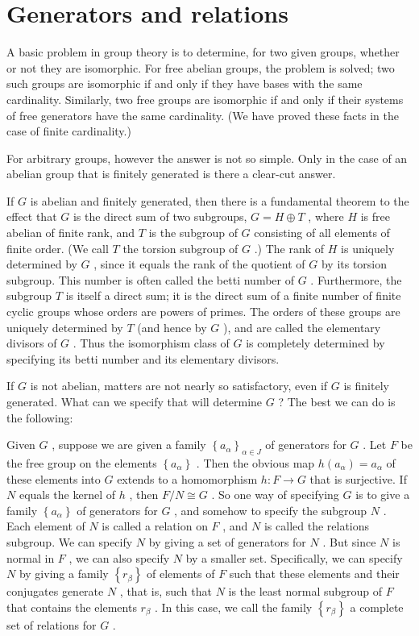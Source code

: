 \section*{Generators and relations}

A basic problem in group theory is to determine, for two given groups, whether or not they are isomorphic. For free abelian groups, the problem is solved; two such groups are isomorphic if and only if they have bases with the same cardinality. Similarly, two free groups are isomorphic if and only if their systems of free generators have the same cardinality. (We have proved these facts in the case of finite cardinality.)

For arbitrary groups, however the answer is not so simple. Only in the case of an abelian group that is finitely generated is there a clear-cut answer.

If \(G\) is abelian and finitely generated, then there is a fundamental theorem to the effect that \(G\) is the direct sum of two subgroups, \(G = H \oplus  T\) , where \(H\) is free abelian of finite rank, and \(T\) is the subgroup of \(G\) consisting of all elements of finite order. (We call \(T\) the torsion subgroup of \(G\) .) The rank of \(H\) is uniquely determined by \(G\) , since it equals the rank of the quotient of \(G\) by its torsion subgroup. This number is often called the betti number of \(G\) . Furthermore, the subgroup \(T\) is itself a direct sum; it is the direct sum of a finite number of finite cyclic groups whose orders are powers of primes. The orders of these groups are uniquely determined by \(T\) (and hence by \(G\) ), and are called the elementary divisors of \(G\) . Thus the isomorphism class of \(G\) is completely determined by specifying its betti number and its elementary divisors.

If \(G\) is not abelian, matters are not nearly so satisfactory, even if \(G\) is finitely generated. What can we specify that will determine \(G\) ? The best we can do is the following:

Given \(G\) , suppose we are given a family \({\left\{  {a}_{\alpha }\right\}  }_{\alpha  \in  J}\) of generators for \(G\) . Let \(F\) be the free group on the elements \(\left\{  {a}_{\alpha }\right\}\) . Then the obvious map \(h\left( {a}_{\alpha }\right)  = {a}_{\alpha }\) of these elements into \(G\) extends to a homomorphism \(h : F \rightarrow  G\) that is surjective. If \(N\) equals the kernel of \(h\) , then \(F/N \cong  G\) . So one way of specifying \(G\) is to give a family \(\left\{  {a}_{\alpha }\right\}\) of generators for \(G\) , and somehow to specify the subgroup \(N\) . Each element of \(N\) is called a relation on \(F\) , and \(N\) is called the relations subgroup. We can specify \(N\) by giving a set of generators for \(N\) . But since \(N\) is normal in \(F\) , we can also specify \(N\) by a smaller set. Specifically, we can specify \(N\) by giving a family \(\left\{  {r}_{\beta }\right\}\) of elements of \(F\) such that these elements and their conjugates generate \(N\) , that is, such that \(N\) is the least normal subgroup of \(F\) that contains the elements \({r}_{\beta }\) . In this case, we call the family \(\left\{  {r}_{\beta }\right\}\) a complete set of relations for \(G\) .

